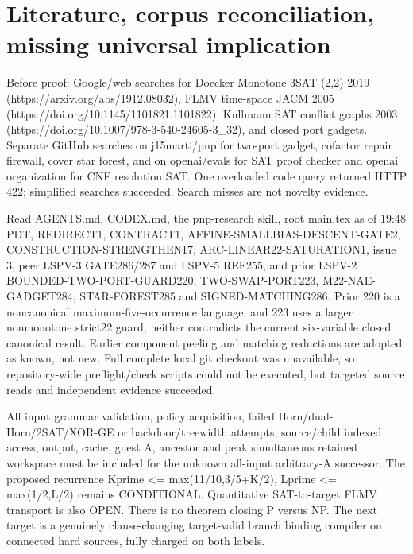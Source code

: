 \documentclass[11pt]{article}
\begin{document}
\section{Literature, corpus reconciliation, missing universal implication}

Before proof: Google/web searches for Doecker Monotone 3SAT (2,2) 2019 (https://arxiv.org/abs/1912.08032), FLMV time-space JACM 2005 (https://doi.org/10.1145/1101821.1101822), Kullmann SAT conflict graphs 2003 (https://doi.org/10.1007/978-3-540-24605-3_32), and closed port gadgets. Separate GitHub searches on j15marti/pnp for two-port gadget, cofactor repair firewall, cover star forest, and on openai/evals for SAT proof checker and openai organization for CNF resolution SAT. One overloaded code query returned HTTP 422; simplified searches succeeded. Search misses are not novelty evidence.

Read AGENTS.md, CODEX.md, the pnp-research skill, root main.tex as of 19:48 PDT, REDIRECT1, CONTRACT1, AFFINE-SMALLBIAS-DESCENT-GATE2, CONSTRUCTION-STRENGTHEN17, ARC-LINEAR22-SATURATION1, issue 3, peer LSPV-3 GATE286/287 and LSPV-5 REF255, and prior LSPV-2 BOUNDED-TWO-PORT-GUARD220, TWO-SWAP-PORT223, M22-NAE-GADGET284, STAR-FOREST285 and SIGNED-MATCHING286. Prior 220 is a noncanonical maximum-five-occurrence language, and 223 uses a larger nonmonotone strict22 guard; neither contradicts the current six-variable closed canonical result. Earlier component peeling and matching reductions are adopted as known, not new. Full complete local git checkout was unavailable, so repository-wide preflight/check scripts could not be executed, but targeted source reads and independent evidence succeeded.

All input grammar validation, policy acquisition, failed Horn/dual-Horn/2SAT/XOR-GE or backdoor/treewidth attempts, source/child indexed access, output, cache, guest A, ancestor and peak simultaneous retained workspace must be included for the unknown all-input arbitrary-A successor. The proposed recurrence Kprime <= max(11/10,3/5+K/2), Lprime <= max(1/2,L/2) remains CONDITIONAL. Quantitative SAT-to-target FLMV transport is also OPEN. There is no theorem closing P versus NP. The next target is a genuinely clause-changing target-valid branch binding compiler on connected hard sources, fully charged on both labels.
\end{document}
